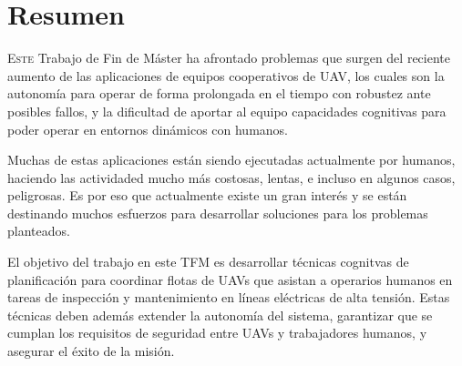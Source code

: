 \documentclass[fontsize=11pt, English=false, Español=true, Myfinal=true, twoside, numbers=noenddot]{scrbook}
\begin{document}





% 
\chapter*{Resumen}
\pagestyle{especial}
{}
\lettrine[lraise=-0.1, lines=2, loversize=0.2]{E}{ste} Trabajo de Fin de Máster ha afrontado problemas que surgen del reciente aumento de las aplicaciones de equipos cooperativos de \gls{UAV}, los cuales son la autonomía para operar de forma prolongada en el tiempo con robustez ante posibles fallos, y la dificultad de aportar al equipo capacidades cognitivas para poder operar en entornos dinámicos con humanos. 

Muchas de estas aplicaciones están siendo ejecutadas actualmente por humanos, haciendo las actividaded mucho más costosas, lentas, e incluso en algunos casos, peligrosas. Es por eso que actualmente existe un gran interés y se están destinando muchos esfuerzos para desarrollar soluciones para los problemas planteados.

El objetivo del trabajo en este TFM es desarrollar técnicas cognitvas de planificación para coordinar flotas de UAVs que asistan a operarios humanos en tareas de inspección y mantenimiento en líneas eléctricas de alta tensión. Estas técnicas deben además extender la autonomía del sistema, garantizar que se cumplan los requisitos de seguridad entre UAVs y trabajadores humanos, y asegurar el éxito de la misión.
\end{document}

